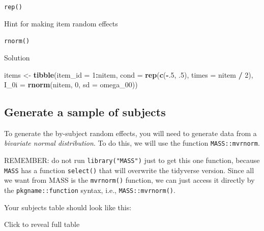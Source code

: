 \documentclass[]{book}
\newenvironment{Shaded}{\begin{snugshade}}{\end{snugshade}}
\newcommand{\DataTypeTok}[1]{\textcolor[rgb]{0.13,0.29,0.53}{#1}}
\newcommand{\DecValTok}[1]{\textcolor[rgb]{0.00,0.00,0.81}{#1}}
\newcommand{\FloatTok}[1]{\textcolor[rgb]{0.00,0.00,0.81}{#1}}
\newcommand{\KeywordTok}[1]{\textcolor[rgb]{0.13,0.29,0.53}{\textbf{#1}}}
\newcommand{\NormalTok}[1]{#1}
\newcommand{\OperatorTok}[1]{\textcolor[rgb]{0.81,0.36,0.00}{\textbf{#1}}}
\newcommand{\StringTok}[1]{\textcolor[rgb]{0.31,0.60,0.02}{#1}}
\begin{document}
\texttt{rep()}

Hint for making item random effects

\texttt{rnorm()}

Solution

\begin{Shaded}
\begin{Highlighting}[]
\NormalTok{items <-}\StringTok{ }\KeywordTok{tibble}\NormalTok{(}\DataTypeTok{item_id =} \DecValTok{1}\OperatorTok{:}\NormalTok{nitem,}
                \DataTypeTok{cond =} \KeywordTok{rep}\NormalTok{(}\KeywordTok{c}\NormalTok{(}\OperatorTok{-}\NormalTok{.}\DecValTok{5}\NormalTok{, }\FloatTok{.5}\NormalTok{), }\DataTypeTok{times =}\NormalTok{ nitem }\OperatorTok{/}\StringTok{ }\DecValTok{2}\NormalTok{),}
                \DataTypeTok{I_0i =} \KeywordTok{rnorm}\NormalTok{(nitem, }\DecValTok{0}\NormalTok{, }\DataTypeTok{sd =}\NormalTok{ omega_}\DecValTok{00}\NormalTok{))}
\end{Highlighting}
\end{Shaded}

\hypertarget{generate-a-sample-of-subjects}{%
\subsection{Generate a sample of subjects}\label{generate-a-sample-of-subjects}}

To generate the by-subject random effects, you will need to generate data from a \emph{bivariate normal distribution}. To do this, we will use the function \texttt{MASS::mvrnorm}.

REMEMBER: do not run \texttt{library("MASS")} just to get this one function, because \texttt{MASS} has a function \texttt{select()} that will overwrite the tidyverse version. Since all we want from MASS is the \texttt{mvrnorm()} function, we can just access it directly by the \texttt{pkgname::function} syntax, i.e., \texttt{MASS::mvrnorm()}.

Your subjects table should look like this:

Click to reveal full table
\end{document}
